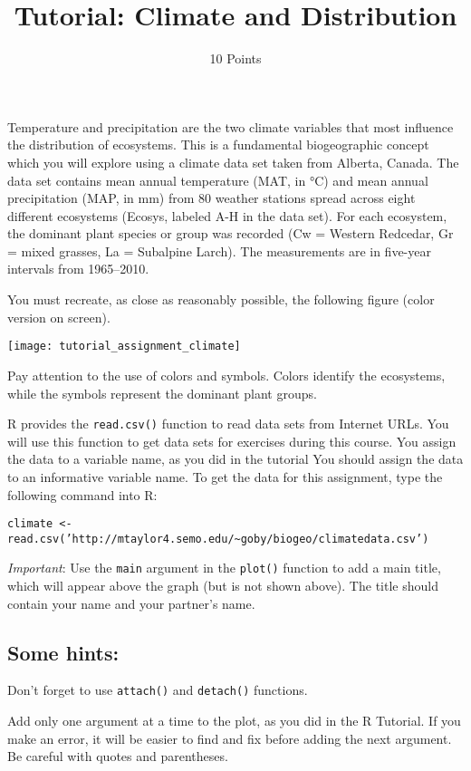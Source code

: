 \documentclass[11pt]{article}
\title{Tutorial: Climate and Distribution}
\author{10 Points}
\date{}                                           %
\begin{document}
\maketitle
\thispagestyle{plain}
Temperature and precipitation are the two climate variables that most
influence the distribution of ecosystems. This is a fundamental
biogeographic concept which you will explore using a climate data set
taken from Alberta, Canada. The data set contains mean annual
temperature (MAT, in °C) and mean annual precipitation (MAP, in mm) from
80 weather stations spread across eight different ecosystems (Ecosys,
labeled A-H in the data set). For each ecosystem, the dominant plant species or group
was recorded (Cw = Western Redcedar, Gr = mixed grasses, La = Subalpine
Larch). The measurements are in five-year intervals from 1965--2010.

You must recreate, as close as reasonably possible, the following figure
(color version on screen).

\begin{center}
	\texttt{[image: tutorial\_assignment\_climate]}
\end{center}

Pay attention to the use of colors and symbols. Colors identify the
ecosystems, while the symbols represent the dominant plant groups.

R provides the \texttt{read.csv()} function to read data sets from Internet 
URLs. You will use this function  to get data sets for exercises during this
course. You assign the data to a variable name, as you did in the tutorial
You should assign the data to an informative variable name. To get the 
data for this assignment, type the following command into R:

\texttt{climate \textless{}-
read.csv('http://mtaylor4.semo.edu/\textasciitilde{}goby/biogeo/climatedata.csv')}

\textit{Important}: Use the \texttt{main} argument in the \texttt{plot()} function to add
a main title, which will appear above the graph (but is not shown
above). The title should contain your name and your partner's name.

\subsection*{Some hints:}

Don't forget to use \texttt{attach()} and \texttt{detach()} functions.

Add only one argument at a time to the plot, as you
did in the R Tutorial. If you make an error, it will be easier to find and fix
before adding the next argument. Be careful with quotes and parentheses.
\end{document}
